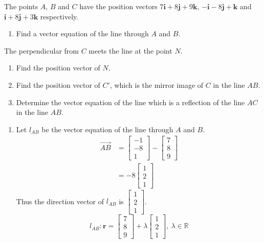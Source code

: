 \documentclass[11pt,a4paper]{book}
\newcommand{\R}{\mathbb{R}}
\begin{document}
\begin{example}

The points $A$, $B$ and $C$ have the position vectors $7\textbf{i}+8\textbf{j}+9\textbf{k}$,
$-\textbf{i}-8\textbf{j}+\textbf{k}$ and $\textbf{i}+8\textbf{j}+3\textbf{k}$
respectively.

\begin{enumerate}[label=(\alph*)]

\item Find a vector equation of the line through $A$ and $B$.

\end{enumerate}

The perpendicular from $C$ meets the line at the point $N$.

\begin{enumerate}[label=(\alph*),start=2]

\item Find the position vector of $N$.

\item Find the position vector of $C'$, which is the mirror image
of $C$ in the line $AB$.

\item Determine the vector equation of the line which is a reflection
of the line $AC$ in the line $AB$.

\end{enumerate}

\Solution

\begin{enumerate}[label=(\alph*)]

\item  Let $l_{AB}$ be the vector equation of the line through $A$
and $B$.
\begin{align*}
\overrightarrow{AB} & =\begin{bmatrix}-1\\
-8\\
1
\end{bmatrix}-\begin{bmatrix}7\\
8\\
9
\end{bmatrix}\\
 & =-8\begin{bmatrix}1\\
2\\
1
\end{bmatrix}
\end{align*}
Thus the direction vector of $l_{AB}$ is $\begin{bmatrix}1\\
2\\
1
\end{bmatrix}$.
\[
l_{AB}:\textbf{r}=\begin{bmatrix}7\\
8\\
9
\end{bmatrix}+\lambda\begin{bmatrix}1\\
2\\
1
\end{bmatrix},\:\lambda\in\R
\]


\end{enumerate}
\end{example}
\end{document}
